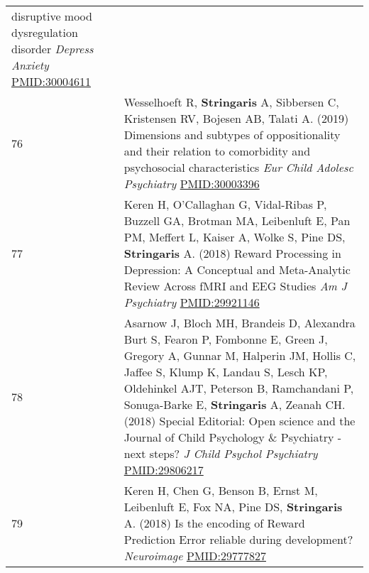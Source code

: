 \documentclass[
]{article}
\begin{document}
\begin{longtable}[]{@{}ll@{}}
\begin{minipage}[t]{0.94\columnwidth}
disruptive mood dysregulation disorder \emph{Depress Anxiety}
\url{PMID:30004611}\strut
\end{minipage}\tabularnewline
\begin{minipage}[t]{0.01\columnwidth}\raggedright
76\strut
\end{minipage} & \begin{minipage}[t]{0.94\columnwidth}\raggedright
Wesselhoeft R, \textbf{Stringaris} A, Sibbersen C, Kristensen RV,
Bojesen AB, Talati A. (2019) Dimensions and subtypes of oppositionality
and their relation to comorbidity and psychosocial characteristics
\emph{Eur Child Adolesc Psychiatry} \url{PMID:30003396}\strut
\end{minipage}\tabularnewline
\begin{minipage}[t]{0.01\columnwidth}\raggedright
77\strut
\end{minipage} & \begin{minipage}[t]{0.94\columnwidth}\raggedright
Keren H, O'Callaghan G, Vidal-Ribas P, Buzzell GA, Brotman MA,
Leibenluft E, Pan PM, Meffert L, Kaiser A, Wolke S, Pine DS,
\textbf{Stringaris} A. (2018) Reward Processing in Depression: A
Conceptual and Meta-Analytic Review Across fMRI and EEG Studies \emph{Am
J Psychiatry} \url{PMID:29921146}\strut
\end{minipage}\tabularnewline
\begin{minipage}[t]{0.01\columnwidth}\raggedright
78\strut
\end{minipage} & \begin{minipage}[t]{0.94\columnwidth}\raggedright
Asarnow J, Bloch MH, Brandeis D, Alexandra Burt S, Fearon P, Fombonne E,
Green J, Gregory A, Gunnar M, Halperin JM, Hollis C, Jaffee S, Klump K,
Landau S, Lesch KP, Oldehinkel AJT, Peterson B, Ramchandani P,
Sonuga-Barke E, \textbf{Stringaris} A, Zeanah CH. (2018) Special
Editorial: Open science and the Journal of Child Psychology \&
Psychiatry - next steps? \emph{J Child Psychol Psychiatry}
\url{PMID:29806217}\strut
\end{minipage}\tabularnewline
\begin{minipage}[t]{0.01\columnwidth}\raggedright
79\strut
\end{minipage} & \begin{minipage}[t]{0.94\columnwidth}\raggedright
Keren H, Chen G, Benson B, Ernst M, Leibenluft E, Fox NA, Pine DS,
\textbf{Stringaris} A. (2018) Is the encoding of Reward Prediction Error
reliable during development? \emph{Neuroimage} \url{PMID:29777827}\strut
\end{minipage}\tabularnewline

\end{longtable}
\end{document}
